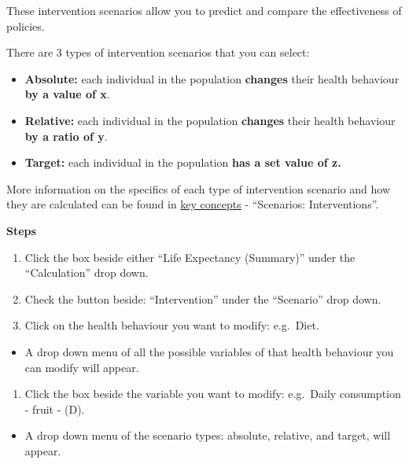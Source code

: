 \documentclass[]{book}
\providecommand{\tightlist}{%
  \setlength{\itemsep}{0pt}\setlength{\parskip}{0pt}}
\begin{document}
These intervention scenarios allow you to predict and compare the effectiveness of policies.

There are 3 types of intervention scenarios that you can select:

\begin{itemize}
\tightlist
\item
  \textbf{Absolute:} each individual in the population \textbf{changes} their health behaviour \textbf{by a value of x}.
\item
  \textbf{Relative:} each individual in the population \textbf{changes} their health behaviour \textbf{by a ratio of y}.
\item
  \textbf{Target:} each individual in the population \textbf{has a set value of z.}
\end{itemize}

More information on the specifics of each type of intervention scenario and how they are calculated can be found in \protect\hyperlink{keyconcepts}{key concepts} - ``Scenarios: Interventions''.

\textbf{Steps}

\begin{enumerate}
\def\labelenumi{\arabic{enumi}.}
\item
  Click the box beside either ``Life Expectancy (Summary)'' under the ``Calculation'' drop down.
\item
  Check the button beside: ``Intervention'' under the ``Scenario'' drop down.
\item
  Click on the health behaviour you want to modify: e.g.~Diet.
\end{enumerate}

\begin{itemize}
\tightlist
\item
  A drop down menu of all the possible variables of that health behaviour you can modify will appear.
\end{itemize}

\begin{enumerate}
\def\labelenumi{\arabic{enumi}.}
\setcounter{enumi}{3}
\tightlist
\item
  Click the box beside the variable you want to modify: e.g.~Daily consumption - fruit - (D).
\end{enumerate}

\begin{itemize}
\tightlist
\item
  A drop down menu of the scenario types: absolute, relative, and target, will appear.
\end{itemize}
\end{document}
